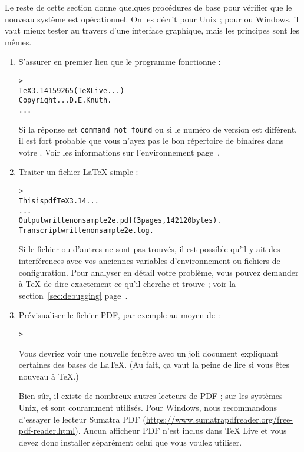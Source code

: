 \documentclass[german, english, french, 12pt]{article}
\renewcommand{\TL}{\TeX{} Live\xspace}%
\begin{document}
Le reste de cette section donne quelques procédures de base pour vérifier que le
nouveau système est opérationnel. On les décrit pour Unix ; pour \macOS{} ou
Windows, il vaut mieux tester au travers d'une interface graphique, mais les
principes sont les mêmes.

\begin{enumerate}

\item S'assurer en premier lieu que le programme  fonctionne :

\begin{alltt}
> 
TeX 3.14159265 (TeX Live ...)
Copyright ... D.E. Knuth.
...
\end{alltt}

Si la réponse est \texttt{command not found} ou si le numéro de version est
différent, il est fort probable que vous n'ayez pas le bon répertoire de
binaires dans votre .  Voir les informations sur l'environnement
page~\pageref{sec:env}.

\item Traiter un fichier \LaTeX{} simple :

\begin{alltt}
> 
This is pdfTeX 3.14...
...
Output written on sample2e.pdf (3 pages, 142120 bytes).
Transcript written on sample2e.log.
\end{alltt}
Si le fichier  ou d'autres ne sont pas trouvés, il est
possible qu'il y ait des interférences avec vos anciennes variables
d'environnement ou fichiers de configuration. Pour analyser en détail votre
problème, vous pouvez demander à \TeX{} de dire exactement ce qu'il cherche et
trouve ; voir la section~\ref{sec:debugging} page~\pageref{sec:debugging}.

\item Prévisualiser le fichier PDF, par exemple au moyen de :
\begin{alltt}
> 
\end{alltt}
Vous devriez voir une nouvelle fenêtre avec un joli document expliquant
certaines des bases de \LaTeX{}.  (Au fait, ça vaut la peine de lire si
vous êtes nouveau à \TeX.)

Bien sûr, il existe de nombreux autres lecteurs de PDF ; sur les systèmes Unix,
 et  sont couramment utilisés. Pour Windows,
nous recommandons d'essayer le lecteur Sumatra PDF
(\url{https://www.sumatrapdfreader.org/free-pdf-reader.html}). Aucun afficheur
PDF n'est inclus dans \TL{} et vous devez donc installer séparément celui que
vous voulez utiliser.


\end{enumerate}
\end{document}
